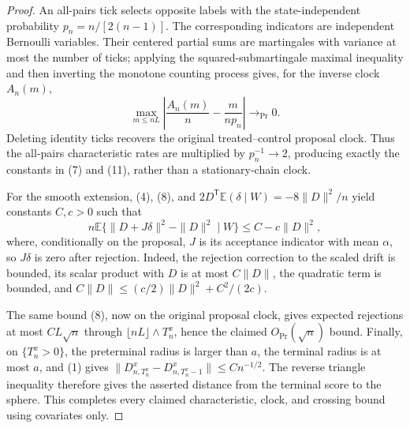 \documentclass{article}
\begin{document}
\begin{proof}
An all-pairs tick selects opposite labels with the state-independent probability \(p_n=n/[2(n-1)]\).  The corresponding indicators are independent Bernoulli variables.  Their centered partial sums are martingales with variance at most the number of ticks; applying the squared-submartingale maximal inequality and then inverting the monotone counting process gives, for the inverse clock \(A_n(m)\),
\[
 \max_{m\le nL}\left|\frac{A_n(m)}n-\frac{m}{np_n}\right|\longrightarrow_{\Pr}0. \tag{12}
\]
Deleting identity ticks recovers the original treated--control proposal clock.  Thus the all-pairs characteristic rates are multiplied by \(p_n^{-1}\to2\), producing exactly the constants in (7) and (11), rather than a stationary-chain clock.

For the smooth extension, (4), (8), and \(2D^{\mathsf T}\mathbb E(\delta\mid W)=-8\|D\|^2/n\) yield constants \(C,c>0\) such that
\[
 n\mathbb E\{\|D+J\delta\|^2-\|D\|^2\mid W\}
 \le C-c\|D\|^2, \tag{13}
\]
where, conditionally on the proposal, \(J\) is its acceptance indicator with mean \(\alpha\), so \(J\delta\) is zero after rejection.  Indeed, the rejection correction to the scaled drift is bounded, its scalar product with \(D\) is at most \(C\|D\|\), the quadratic term is bounded, and \(C\|D\|\le(c/2)\|D\|^2+C^2/(2c)\).

The same bound (8), now on the original proposal clock, gives expected rejections at most \(CL\sqrt n\) through \(\lfloor nL\rfloor\wedge T_n^x\), hence the claimed \(O_{\Pr}(\sqrt n)\) bound.  Finally, on \(\{T_n^x>0\}\), the preterminal radius is larger than \(a\), the terminal radius is at most \(a\), and (1) gives \(\|D^x_{n,T_n^x}-D^x_{n,T_n^x-1}\|\le Cn^{-1/2}\).  The reverse triangle inequality therefore gives the asserted distance from the terminal score to the sphere.  This completes every claimed characteristic, clock, and crossing bound using covariates only.
\end{proof}
\end{document}
